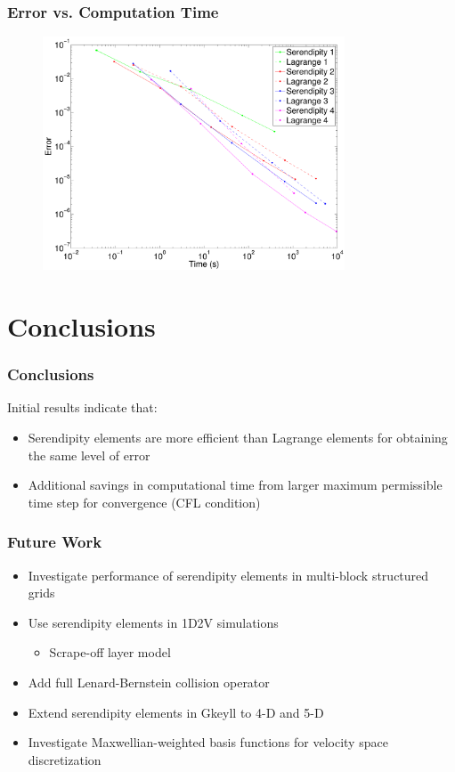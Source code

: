 \documentclass[serif,12pt]{beamer}
\begin{document}
\begin{frame}
\frametitle{Error vs. Computation Time}
	\begin{figure}
   		\includegraphics[width=0.8\textwidth]{figures/serendipityConvergence.pdf}
	\end{figure}
\end{frame}

\section{Conclusions}
\begin{frame}
\frametitle{Conclusions}
Initial results indicate that:
\begin{itemize}
	\item Serendipity elements are more efficient than Lagrange elements for obtaining the same level of error
	\item Additional savings in computational time from larger maximum permissible time step for convergence (CFL condition)
\end{itemize}
\end{frame}

\begin{frame}
\frametitle{Future Work}
	\begin{itemize}
		\item Investigate performance of serendipity elements in multi-block structured grids
		\item Use serendipity elements in 1D2V simulations
		\begin{itemize}
			\item Scrape-off layer model
		\end{itemize}
		\item Add full Lenard-Bernstein collision operator
		\item Extend serendipity elements in Gkeyll to 4-D and 5-D
		\item Investigate Maxwellian-weighted basis functions for velocity space discretization
	\end{itemize}
\end{frame}
\end{document}

